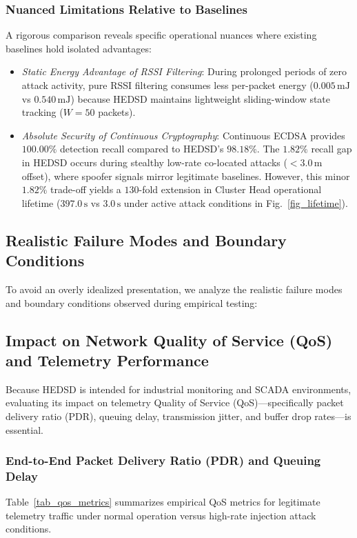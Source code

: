 \documentclass[conference]{IEEEtran}
\begin{document}
\subsubsection{Nuanced Limitations Relative to Baselines}
A rigorous comparison reveals specific operational nuances where existing baselines hold isolated advantages:
\begin{itemize}
    \item \textit{Static Energy Advantage of RSSI Filtering}: During prolonged periods of zero attack activity, pure RSSI filtering consumes less per-packet energy ($0.005\,\text{mJ}$ vs $0.540\,\text{mJ}$) because HEDSD maintains lightweight sliding-window state tracking ($W=50$ packets).
    \item \textit{Absolute Security of Continuous Cryptography}: Continuous ECDSA provides $100.00\%$ detection recall compared to HEDSD's $98.18\%$. The $1.82\%$ recall gap in HEDSD occurs during stealthy low-rate co-located attacks ($<3.0\,\text{m}$ offset), where spoofer signals mirror legitimate baselines. However, this minor $1.82\%$ trade-off yields a $130$-fold extension in Cluster Head operational lifetime ($397.0\,\text{s}$ vs $3.0\,\text{s}$ under active attack conditions in Fig.~\ref{fig_lifetime}).
\end{itemize}

\subsection{Realistic Failure Modes and Boundary Conditions}
To avoid an overly idealized presentation, we analyze the realistic failure modes and boundary conditions observed during empirical testing:
\subsection{Impact on Network Quality of Service (QoS) and Telemetry Performance}
\label{subsec_qos_evaluation}
Because HEDSD is intended for industrial monitoring and SCADA environments, evaluating its impact on telemetry Quality of Service (QoS)—specifically packet delivery ratio (PDR), queuing delay, transmission jitter, and buffer drop rates—is essential.

\subsubsection{End-to-End Packet Delivery Ratio (PDR) and Queuing Delay}
Table~\ref{tab_qos_metrics} summarizes empirical QoS metrics for legitimate telemetry traffic under normal operation versus high-rate injection attack conditions.
\end{document}
